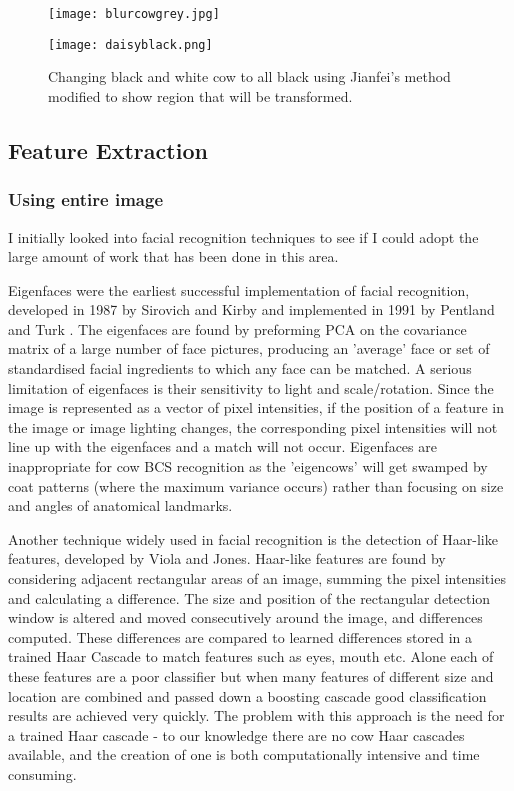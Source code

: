 \documentclass[11pt]{article}
\begin{document}
	\begin{figure}[h]
		\centering
		\parbox{6cm}{\texttt{[image: blurcowgrey.jpg]}}
		\parbox{6cm}{\texttt{[image: daisyblack.png]}}
		\caption{Changing black and white cow to all black using Jianfei's method modified to show region that will be transformed.\cite{Jianfei2011}}
	\end{figure}
\newpage
\subsection{Feature Extraction}
	\subsubsection{Using entire image}
	I initially looked into facial recognition techniques to see if I could adopt the large amount of work that has been done in this area.


	Eigenfaces were the earliest successful implementation of facial recognition, developed in 1987 by Sirovich and Kirby and implemented in 1991 by Pentland and Turk \cite{Turk1991}.
	The eigenfaces are found by preforming PCA on the covariance matrix of a large number of face pictures, producing an 'average' face or set of standardised facial ingredients to which any face can be matched.
	A serious limitation of eigenfaces is their sensitivity to light and scale/rotation. 
	Since the image is represented as a vector of pixel intensities, if the position of a feature in the image or image lighting changes, the corresponding pixel intensities will not line up with the eigenfaces and a match will not occur.
	Eigenfaces are inappropriate for cow BCS recognition as the 'eigencows' will get swamped by coat patterns (where the maximum variance occurs) rather than focusing on size and angles of anatomical landmarks.



	Another technique widely used in facial recognition is the detection of Haar-like features, developed by Viola and Jones\cite{viola2004}.
	Haar-like features are found by considering adjacent rectangular areas of an image, summing the pixel intensities and calculating a difference. 
	The size and position of the rectangular detection window is altered and moved consecutively around the image, and differences computed.
	These differences are compared to learned differences stored in a trained Haar Cascade to match features such as eyes, mouth etc.
	Alone each of these features are a poor classifier but when many features of different size and location are combined and passed down a boosting cascade good classification results are achieved very quickly.
	The problem with this approach is the need for a trained Haar cascade - to our knowledge there are no cow Haar cascades available, and the creation of one is both computationally intensive and time consuming.
	
\end{document}
